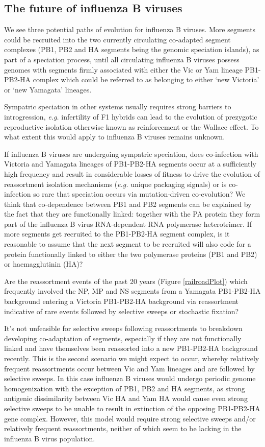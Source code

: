 \documentclass[11pt,oneside,letterpaper]{article}
\begin{document}
\subsection*{The future of influenza B viruses}
We see three potential paths of evolution for influenza B viruses.
More segments could be recruited into the two currently circulating co-adapted segment complexes (PB1, PB2 and HA segments being the genomic speciation islands), as part of a speciation process, until all circulating influenza B viruses possess genomes with segments firmly associated with either the Vic or Yam lineage PB1-PB2-HA complex which could be referred to as belonging to either `new Victoria' or `new Yamagata' lineages.

Sympatric speciation in other systems usually requires strong barriers to introgression, \textit{e.g.} infertility of F1 hybrids can lead to the evolution of prezygotic reproductive isolation otherwise known as reinforcement or the Wallace effect.
To what extent this would apply to influenza B viruses remains unknown.

If influenza B viruses are undergoing sympatric speciation, does co-infection with Victoria and Yamagata lineages of PB1-PB2-HA segments occur at a sufficiently high frequency and result in considerable losses of fitness to drive the evolution of reassortment isolation mechanisms (\textit{e.g.} unique packaging signals) or is co-infection so rare that speciation occurs via mutation-driven co-evolution?
We think that co-dependence between PB1 and PB2 segments can be explained by the fact that they are functionally linked: together with the PA protein they form part of the influenza B virus RNA-dependent RNA polymerase heterotrimer.
If more segments get recruited to the PB1-PB2-HA segment complex, is it reasonable to assume that the next segment to be recruited will also code for a protein functionally linked to either the two polymerase proteins (PB1 and PB2) or haemagglutinin (HA)?

Are the reassortment events of the past 20 years (Figure \ref{railroadPlot}) which frequently involved the NP, MP and NS segments from a Yamagata PB1-PB2-HA background entering a Victoria PB1-PB2-HA background via reassortment indicative of rare events followed by selective sweeps or stochastic fixation?

It's not unfeasible for selective sweeps following reassortments to breakdown developing co-adaptation of segments, especially if they are not functionally linked and have themselves been reassorted into a new PB1-PB2-HA background recently.
This is the second scenario we might expect to occur, whereby relatively frequent reassortments occur between Vic and Yam lineages and are followed by selective sweeps.
In this case influenza B viruses would undergo periodic genome homogenization with the exception of PB1, PB2 and HA segments, as strong antigenic dissimilarity between Vic HA and Yam HA would cause even strong selective sweeps to be unable to result in extinction of the opposing PB1-PB2-HA gene complex.
However, this model would require strong selective sweeps and/or relatively frequent reassortments, neither of which seem to be lacking in the influenza B virus population.
\end{document}
